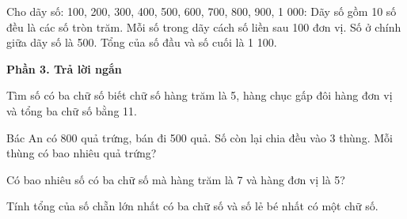 \begin{ex} %
Cho dãy số: 100, 200, 300, 400, 500, 600, 700, 800, 900, 1 000:
\choiceTF
{\True Dãy số gồm 10 số đều là các số tròn trăm.}
{\True Mỗi số trong dãy cách số liền sau 100 đơn vị.}
{Số ở chính giữa dãy số là 500.}
{\True Tổng của số đầu và số cuối là 1 100.}
\end{ex}

\textbf{Phần 3. Trả lời ngắn}

\begin{ex} %
Tìm số có ba chữ số biết chữ số hàng trăm là 5, hàng chục gấp đôi hàng đơn vị và tổng ba chữ số bằng 11.
\end{ex}

\begin{ex} %
Bác An có 800 quả trứng, bán đi 500 quả. Số còn lại chia đều vào 3 thùng. Mỗi thùng có bao nhiêu quả trứng?
\end{ex}

\begin{ex} %
Có bao nhiêu số có ba chữ số mà hàng trăm là 7 và hàng đơn vị là 5?
\end{ex}

\begin{ex} %
Tính tổng của số chẵn lớn nhất có ba chữ số và số lẻ bé nhất có một chữ số.
\end{ex}

